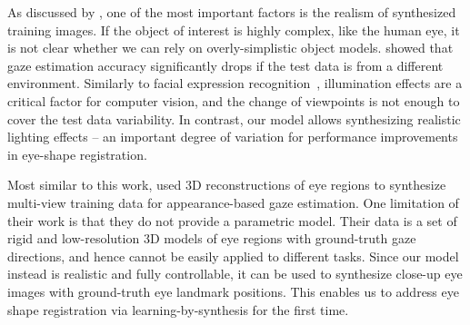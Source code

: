 As discussed by \citet{kaneva2011evaluation}, one of the most important factors is the realism of synthesized training images.
If the object of interest is highly complex, like the human eye, it is not clear whether we can rely on overly-simplistic object models.
\citet{zhang15_cvpr} showed that gaze estimation accuracy significantly drops if the test data is from a different environment.
Similarly to facial expression recognition~\cite{stratou2011effect}, illumination effects are a critical factor for computer vision, and the change of viewpoints is not enough to cover the test data variability.
In contrast, our model allows synthesizing realistic lighting effects -- an important degree of variation for performance improvements in eye-shape registration.

Most similar to this work, \citet{sugano2014learning} used 3D reconstructions of eye regions to synthesize multi-view training data for appearance-based gaze estimation.
One limitation of their work is that they do not provide a parametric model.
Their data is a set of rigid and low-resolution 3D models of eye regions with ground-truth gaze directions, and hence cannot be easily applied to different tasks.
Since our model instead is realistic and fully controllable, it can be used to synthesize close-up eye images with ground-truth eye landmark positions.
This enables us to address eye shape registration via learning-by-synthesis for the first time.


